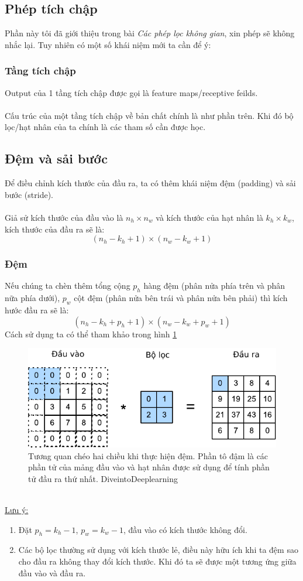 \documentclass{article}
\begin{document}
\subsection{Phép tích chập}
Phần này tôi đã giới thiệu trong bài \textit{Các phép lọc không gian}, xin phép sẽ không nhắc lại. Tuy nhiên có một số khái niệm mới ta cần để ý:
\subsubsection*{Tầng tích chập}
Output của 1 tầng tích chập được gọi là feature maps/receptive feilds. \\\\
Cấu trúc của một tầng tích chập về bản chất chính là như phần trên. Khi đó bộ lọc/hạt nhân của ta chính là các tham số cần được học.
\subsection{Đệm và sải bước}
Để điều chỉnh kích thước của đầu ra, ta có thêm khái niệm đệm (padding) và sải bước (stride).\\\\
Giả sử kích thước của đầu vào là $n_h \times n_w$ và kích thước của hạt nhân là $k_h \times k_w$, kích thước của đầu ra sẽ là:
$$(n_h-k_h+1)\times(n_w-k_w+1)$$
\subsubsection{Đệm}
Nếu chúng ta chèn thêm tổng cộng $p_h$ hàng đệm (phân nửa phía trên và phân nữa phía dưới), $p_w$ cột đệm (phân nửa bên trái và phân nửa bên phải) thì kích hước đầu ra sẽ là:$$(n_h-k_h+p_h+1)\times(n_w-k_w+p_w+1)$$
Cách sử dụng ta có thể tham khảo trong hình \ref{fig1}
\begin{figure}[ht!]
    \centering
    \includegraphics[width = 0.7\linewidth]{conv-pad.pdf}
    \caption{Tương quan chéo hai chiều khi thực hiện đệm. Phần tô đậm là các phần tử của mảng đầu vào và hạt nhân được sử dụng để tính phần tử đầu ra thứ nhất. DiveintoDeeplearning}
    \label{fig1}
\end{figure}
\phantom{a}\\
\underline{Lưu ý:}
\begin{enumerate}
    \item Đặt $p_h = k_h-1$, $p_w = k_w - 1$, đầu vào có kích thước không đổi.
    \item Các bộ lọc thường sử dụng với kích thước lẻ, điều này hữu ích khi ta đệm sao cho đầu ra không thay đổi kích thước. Khi đó ta sẽ được một tương ứng giữa đầu vào và đầu ra.
\end{enumerate}
\end{document}
